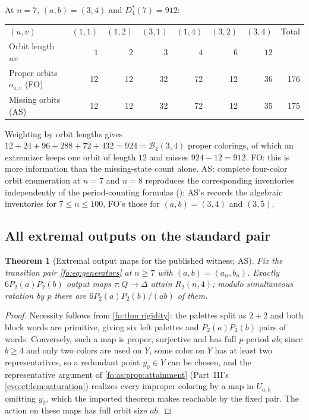 \documentclass[11pt,a4paper]{article}
\numberwithin{equation}{section}
\newtheorem{theorem}{Theorem}[section]
\theoremstyle{definition}
\theoremstyle{remark}
\newcommand{\D}{\Delta}
\newcommand{\Bip}{\mathcal B}
\begin{document}
\begin{example}\label{fo:ex:inventory7}
At $n=7$, $(a,b)=(3,4)$ and $D^*_4(7)=912$:
\begin{center}
\small
\begin{tabular}{@{}lrrrrrrr@{}}
\toprule
$(u,v)$ & $(1,1)$ & $(1,2)$ & $(3,1)$ & $(1,4)$ & $(3,2)$ & $(3,4)$ & Total\\
Orbit length $uv$ & $1$ & $2$ & $3$ & $4$ & $6$ & $12$ & \\
\midrule
Proper orbits $o_{u,v}$ (FO) & 12 & 12 & 32 & 72 & 12 & 36 & 176\\
Missing orbits (AS) & 12 & 12 & 32 & 72 & 12 & 35 & 175\\
\bottomrule
\end{tabular}
\end{center}
Weighting by orbit lengths gives $12+24+96+288+72+432=924=\Bip_4(3,4)$
proper colorings, of which an extremizer keeps one orbit of length $12$ and
misses $924-12=912$. FO: this is more information than the missing-state count
alone. AS: complete four-color orbit enumeration at $n=7$ and $n=8$
reproduces the corresponding inventories independently of the period-counting
formulas (); AS's
 records the algebraic
inventories for $7\le n\le100$, FO's 
those for $(a,b)=(3,4)$ and $(3,5)$.
\end{example}

\subsection{All extremal outputs on the standard pair}

\begin{theorem}[Extremal output maps for the published witness; AS]\label{fo:as:thm:outputmaps}
Fix the transition pair \eqref{fo:eq:generators} at $n\ge7$ with
$(a,b)=(a_n,b_n)$. Exactly $6P_2(a)P_2(b)$ output maps $\tau:Q\to\D$ attain
$R_2(n,4)$; modulo simultaneous rotation by $p$ there are
$6P_2(a)P_2(b)/(ab)$ of them.
\end{theorem}

\begin{proof}
Necessity follows from \cref{fo:thm:rigidity}: the palettes split as $2+2$
and both block words are primitive, giving six left palettes and
$P_2(a)P_2(b)$ pairs of words. Conversely, such a map is proper, surjective and
has full $p$-period $ab$; since $b\ge4$ and only two colors are used on $Y$,
some color on $Y$ has at least two representatives, so a redundant point
$y_0\in Y$ can be chosen, and the representative argument of
\cref{fo:as:prop:attainment} (Part~III's \cref{evo:et:lem:saturation})
realizes every improper coloring by a map in $U_{a,b}$ omitting $y_0$, which
the imported theorem makes reachable by the fixed pair. The action on these
maps has full orbit size $ab$.
\end{proof}
\end{document}
